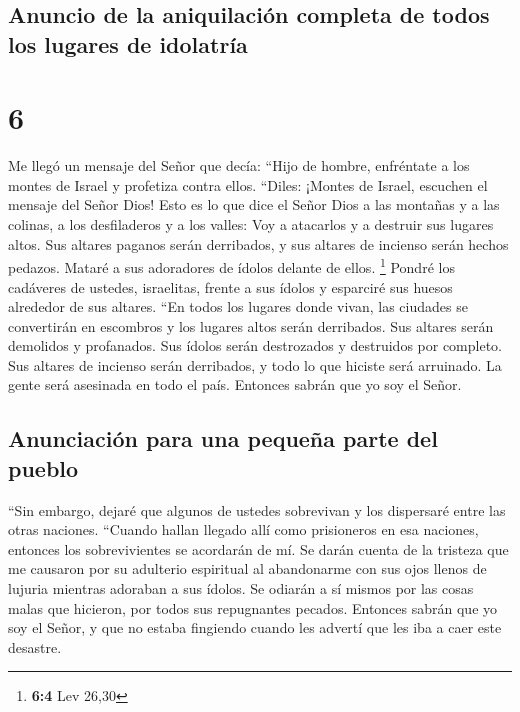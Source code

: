 \hypertarget{anuncio-de-la-aniquilaciuxf3n-completa-de-todos-los-lugares-de-idolatruxeda}{%
\subsection{Anuncio de la aniquilación completa de todos los lugares de
idolatría}\label{anuncio-de-la-aniquilaciuxf3n-completa-de-todos-los-lugares-de-idolatruxeda}}

\hypertarget{section-5}{%
\section{6}\label{section-5}}

 Me llegó un mensaje del Señor que decía: 
``Hijo de hombre, enfréntate a los montes de Israel y profetiza contra
ellos.  ``Diles: ¡Montes de Israel, escuchen el mensaje
del Señor Dios! Esto es lo que dice el Señor Dios a las montañas y a las
colinas, a los desfiladeros y a los valles: Voy a atacarlos y a destruir
sus lugares altos.  Sus altares paganos serán derribados,
y sus altares de incienso serán hechos pedazos. Mataré a sus adoradores
de ídolos delante de ellos. \footnote{\textbf{6:4} Lev 26,30}
 Pondré los cadáveres de ustedes, israelitas, frente a sus
ídolos y esparciré sus huesos alrededor de sus altares. 
``En todos los lugares donde vivan, las ciudades se convertirán en
escombros y los lugares altos serán derribados. Sus altares serán
demolidos y profanados. Sus ídolos serán destrozados y destruidos por
completo. Sus altares de incienso serán derribados, y todo lo que
hiciste será arruinado.  La gente será asesinada en todo
el país. Entonces sabrán que yo soy el Señor.

\hypertarget{anunciaciuxf3n-para-una-pequeuxf1a-parte-del-pueblo}{%
\subsection{Anunciación para una pequeña parte del
pueblo}\label{anunciaciuxf3n-para-una-pequeuxf1a-parte-del-pueblo}}

 ``Sin embargo, dejaré que algunos de ustedes sobrevivan y
los dispersaré entre las otras naciones.  ``Cuando hallan
llegado allí como prisioneros en esa naciones, entonces los
sobrevivientes se acordarán de mí. Se darán cuenta de la tristeza que me
causaron por su adulterio espiritual al abandonarme con sus ojos llenos
de lujuria mientras adoraban a sus ídolos. Se odiarán a sí mismos por
las cosas malas que hicieron, por todos sus repugnantes pecados.
 Entonces sabrán que yo soy el Señor, y que no estaba
fingiendo cuando les advertí que les iba a caer este desastre.

